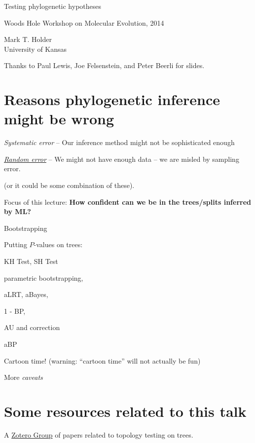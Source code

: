 \documentclass[landscape]{foils}
\begin{document}
\myNewSlide
\huge 
{\begin{center}Testing phylogenetic hypotheses\end{center}}
\vskip 3cm
\large Woods Hole Workshop on Molecular Evolution, 2014\par 
\vskip 3cm
\normalsize
\normalsize
Mark T. Holder\\
University of Kansas\par 
\vskip 1cm
Thanks to Paul Lewis, Joe Felsenstein, and Peter Beerli for slides.

\myNewSlide
\section*{Reasons phylogenetic inference might be wrong}
\Large
\begin{compactenum}
	\item {\em Systematic error} -- Our inference method might not be sophisticated enough
	\item \underline{{\em Random error}} -- We might not have enough data --  we are misled by sampling error.
\end{compactenum}

(or it could be some combination of these).

{Focus of this lecture: {\bf How confident can we be in the trees/splits inferred by ML?}}

\myNewSlide
\begin{compactenum}
	\item Bootstrapping
	\item Putting $P$-values on trees:
	\begin{compactitem}
		\item KH Test, SH Test
		\item parametric bootstrapping,
		\item aLRT, aBayes,
		\item 1 - BP,
		\item AU and \citet{EfronHH1996} correction
		\item aBP
	\end{compactitem}
	\item Cartoon time! ({\small warning: ``cartoon time'' will not actually be fun})
	\item More {\em caveats}
\end{compactenum}

\myNewSlide
\section*{Some resources related to this talk}
A \href{http://www.zotero.org/groups/confidence_statements_on_phylogenies}{Zotero Group} of papers related to topology testing on trees.
\end{document}

